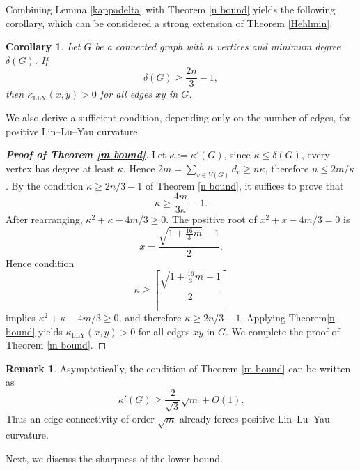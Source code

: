 \documentclass[11pt,bezier]{article}
\newtheorem{cor}{Corollary}[section]
\theoremstyle{definition}
\newtheorem{remark}{Remark}
\theoremstyle{definition}
\theoremstyle{nonumber}
\newtheorem*{theorem*}{Theorem}
\begin{document}
Combining Lemma \ref{kappadelta} with Theorem \ref{n bound} yields the following corollary, which can be considered a strong extension of Theorem \ref{Hehlmin}.

\begin{cor}
Let $G$ be a connected graph with $n$ vertices and minimum degree $\delta(G)$. If$$\delta(G)\geq \frac{2n}{3}-1,$$ then $\kappa_{\mathrm{LLY}}(x,y)>0$ for all edges $xy$ in $G$.    
\end{cor}

We also derive a sufficient condition, depending only on the number of edges, for positive Lin--Lu--Yau curvature.


\begin{proof}[\bf{Proof of Theorem \ref{m bound}}]
Let $\kappa:=\kappa'(G)$, since $\kappa\leq \delta(G)$, every vertex has degree at least $\kappa$.
Hence $2m=\sum_{v\in V(G)} d_v \geq n\kappa$,
therefore $n\leq 2m/\kappa$.
By the condition $\kappa\geq 2n/3-1$ of Theorem \ref{n bound}, it suffices to prove that
$$\kappa\geq \frac{4m}{3\kappa}-1.$$
After rearranging, $\kappa^2+\kappa-4m/3\geq 0.$
The positive root of $x^2+x-4m/3=0$ is
$$x=\frac{\sqrt{1+\frac{16}{3}m}-1}{2}.$$
Hence condition
$$
\kappa\geq \left\lceil
\frac{\sqrt{1+\frac{16}{3}m}-1}{2}
\right\rceil
$$
implies $\kappa^2+\kappa-4m/3\geq 0$, and therefore $\kappa\geq 2n/3-1$.
Applying Theorem\ref{n bound} yields $\kappa_{\mathrm{LLY}}(x,y)>0$
for all edges $xy$ in $G$. We complete the proof of Theorem \ref{m bound}. 
\end{proof}

\begin{remark}
Asymptotically, the condition of
Theorem \ref{m bound} can be written as
$$
\kappa'(G)\geq \frac{2}{\sqrt3}\sqrt m + O(1).
$$
Thus an edge-connectivity of order $\sqrt m$
already forces positive Lin--Lu--Yau curvature.
\end{remark}

Next, we discuss the sharpness of the lower bound.

\end{document}

